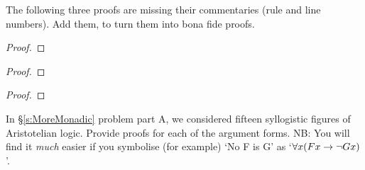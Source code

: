 \problempart 
\label{pr.justifyFOLproof}
The following three proofs are missing their commentaries (rule and line numbers). Add them, to turn them into bona fide proofs. 
\begin{multicols}{2}\begin{proof}
\open{}
	\open
\open
{}
\close
\open
{}
\open
{}
\close
{}%
\close
{}%
	\close
{}%
\end{proof}
\begin{proof}
\open{}
 {}
 {}
\end{proof}
\begin{proof}
\open{}
\open	{}
\open
\close
{}
\end{proof}
\end{multicols}


\problempart
\label{pr.BarbaraEtc.proof1}
In §\ref{s:MoreMonadic} problem part A, we considered fifteen syllogistic figures of Aristotelian logic. Provide proofs for each of the argument forms. NB: You will find it \emph{much} easier if you symbolise (for example) `No F is G' as `$\forall x (Fx \rightarrow \neg Gx)$'.


